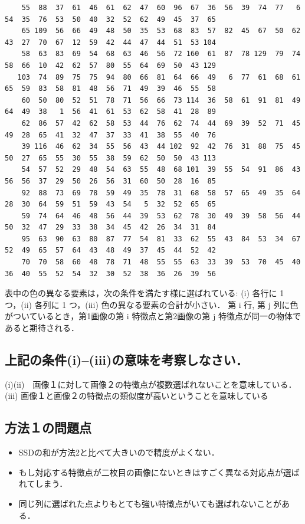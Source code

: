 \documentclass[11pt]{jarticle}
\begin{document}
\begin{verbatim}
    55  88  37  61  46  61  62  47  60  96  67  36  56  39  74  77   6  54  35  76  53  50  40  32  52  62  49  45  37  65 
    65 109  56  66  49  48  50  35  53  68  83  57  82  45  67  50  62  43  27  70  67  12  59  42  44  47  44  51  53 104 
    58  63  83  69  54  68  63  46  56  72 160  61  87  78 129  79  74  58  66  10  42  62  57  80  55  64  69  50  43 129 
   103  74  89  75  75  94  80  66  81  64  66  49   6  77  61  68  61  65  59  83  58  81  48  56  71  49  39  46  55  58 
    60  50  80  52  51  78  71  56  66  73 114  36  58  61  91  81  49  64  49  38   1  56  41  61  53  62  58  41  28  89 
    62  86  57  42  62  58  53  44  76  62  74  44  69  39  52  71  45  49  28  65  41  32  47  37  33  41  38  55  40  76 
    39 116  46  62  34  55  56  43  44 102  92  42  76  31  88  75  45  50  27  65  55  30  55  38  59  62  50  50  43 113 
    54  57  52  29  48  54  63  55  48  68 101  39  55  54  91  86  43  56  56  37  29  50  26  56  31  60  50  28  16  85 
    92  88  73  69  78  59  49  35  78  31  68  58  57  65  49  35  64  28  30  64  59  51  59  43  54   5  32  52  65  65 
    59  74  64  46  48  56  44  39  53  62  78  30  49  39  58  56  44  50  32  47  29  33  38  34  45  42  26  34  31  84 
    95  63  90  63  80  87  77  54  81  33  62  55  43  84  53  34  67  52  49  65  57  64  43  48  49  37  45  44  52  42 
    70  70  58  60  48  78  71  48  55  55  63  33  39  53  70  45  40  36  40  55  52  54  32  30  52  38  36  26  39  56 
\end{verbatim}
\normalsize
表中の色の異なる要素は，次の条件を満たす様に選ばれている: (i) 各行に 1 つ，(ii) 各列に 1 つ，(iii) 色の異なる要素の合計が小さい．
第 i 行, 第 j 列に色がついているとき，第1画像の第 i 特徴点と第2画像の第 j 特徴点が同一の物体であると期待される．

\subsection{上記の条件(i)–(iii)の意味を考察しなさい．}
(i)(ii)　画像１に対して画像２の特徴点が複数選ばれないことを意味している．
(iii) 画像１と画像２の特徴点の類似度が高いということを意味している

\subsection{方法１の問題点}
\begin{itemize}
    \item SSDの和が方法2と比べて大きいので精度がよくない．
    \item もし対応する特徴点が二枚目の画像にないときはすごく異なる対応点が選ばれてしまう．
    \item 同じ列に選ばれた点よりもとても強い特徴点がいても選ばれないことがある．
  \end{itemize}
\end{document}
